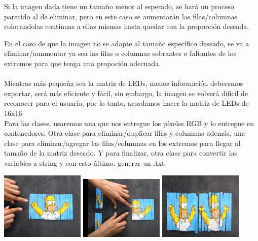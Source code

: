 \documentclass{article}
\begin{document}
Si la imagen dada tiene un tamaño menor al esperado, se hará un proceso parecido al de eliminar, pero en este caso se aumentarán las filas/columnas colocandolas continuas a ellas mismas  hasta quedar con la proporción deseada.

En el caso de que la imagen no se adapte al tamaño específico deseado, se va a eliminar/aunmentar ya sea las filas o columnas sobrantes o faltantes de los extremos para que tenga una propoción adecuada.\\
\\Mientras más pequeña sea la matriz de LEDs, menos información deberemos exportar, será más eficiente y fácil, sin embargo, la imagen se volverá dificil de reconocer para el usuario, por lo tanto, acordamos hacer la matriz de LEDs de 16x16\\


Para las clases, usaremos una que nos entregue los píxeles RGB y lo entregue en contenedores. Otra clase para eliminar/duplicar filas y columnas además, una clase para eliminar/agregar las filas/columnas en los extremos para llegar al tamaño de la matriz deseado. Y para finalizar, otra clase para convertir las variables a string y con esto último, generar un .txt


\includegraphics[width=4cm]{Imagenes/recorte1.jpeg}
\includegraphics[width=4cm]{Imagenes/recorte2.jpeg}
\includegraphics[width=4cm]{Imagenes/recorte3.jpeg}
\vspace{0,3cm}
\end{document}
